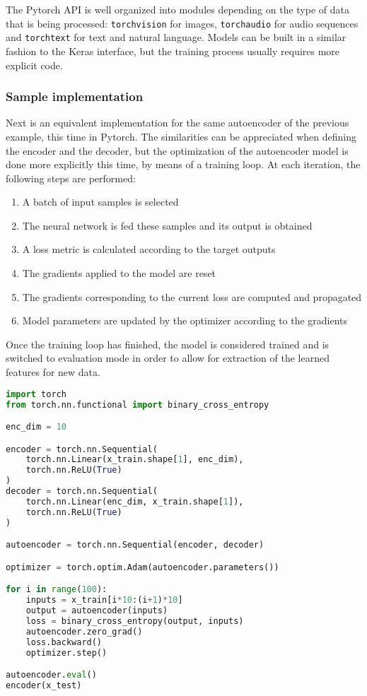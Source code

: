 The Pytorch API is well organized into modules depending on the type of data that is being processed: \texttt{torchvision} for images, \texttt{torchaudio} for audio sequences and \texttt{torchtext} for text and natural language. Models can be built in a similar fashion to the Keras interface, but the training process usually requires more explicit code.

\subsubsection{Sample implementation}

Next is an equivalent implementation for the same autoencoder of the previous example, this time in Pytorch. The similarities can be appreciated when defining the encoder and the decoder, but the optimization of the autoencoder model is done more explicitly this time, by means of a training loop. At each iteration, the following steps are performed:

\begin{enumerate}
    \item A batch of input samples is selected
    \item The neural network is fed these samples and its output is obtained
    \item A loss metric is calculated according to the target outputs
    \item The gradients applied to the model are reset
    \item The gradients corresponding to the current loss are computed and propagated
    \item Model parameters are updated by the optimizer according to the gradients
\end{enumerate}

Once the training loop has finished, the model is considered trained and is switched to evaluation mode in order to allow for extraction of the learned features for new data.

\begin{lstlisting}[language=Python]
import torch
from torch.nn.functional import binary_cross_entropy

enc_dim = 10

encoder = torch.nn.Sequential(
    torch.nn.Linear(x_train.shape[1], enc_dim),
    torch.nn.ReLU(True)
)
decoder = torch.nn.Sequential(
    torch.nn.Linear(enc_dim, x_train.shape[1]),
    torch.nn.ReLU(True)
)

autoencoder = torch.nn.Sequential(encoder, decoder)

optimizer = torch.optim.Adam(autoencoder.parameters())

for i in range(100):
    inputs = x_train[i*10:(i+1)*10]
    output = autoencoder(inputs)
    loss = binary_cross_entropy(output, inputs)
    autoencoder.zero_grad()
    loss.backward()
    optimizer.step()

autoencoder.eval()
encoder(x_test)
\end{lstlisting}
